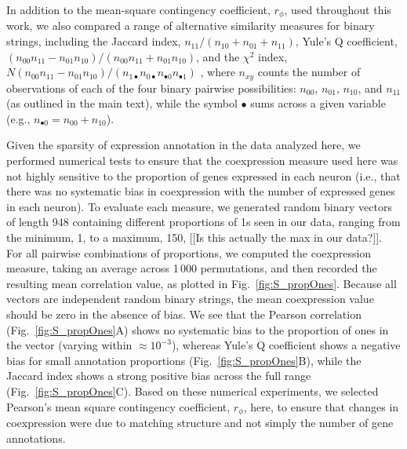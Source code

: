 \documentclass[10pt,letterpaper]{article}
\begin{document}
In addition to the mean-square contingency coefficient, $r_\phi$, used throughout this work, we also compared a range of alternative similarity measures for binary strings, including the
Jaccard index, $n_{11}/(n_{10}+n_{01}+n_{11})$,
Yule's Q coefficient, $(n_{00}n_{11} - n_{01}n_{10})/(n_{00}n_{11} + n_{01}n_{10})$,
and the $\chi^2$ index, $N (n_{00}n_{11} - n_{01}n_{10})/(n_{1\bullet}n_{0\bullet}n_{\bullet 0}n_{\bullet 1})$ \cite{Kaufman2006}, where $n_{xy}$ counts the number of observations of each of the four binary pairwise possibilities: $n_{00}$, $n_{01}$, $n_{10}$, and $n_{11}$ (as outlined in the main text), while the symbol $\bullet$ sums across a given variable (e.g., $n_{\bullet 0} = n_{00} + n_{10}$).

Given the sparsity of expression annotation in the data analyzed here, we performed numerical tests to ensure that the coexpression measure used here was not highly sensitive to the proportion of genes expressed in each neuron (i.e., that there was no systematic bias in coexpression with the number of expressed genes in each neuron).
To evaluate each measure, we generated random binary vectors of length 948 containing different proportions of 1s seen in our data, ranging from the minimum, 1, to a maximum, 150, [[Is this actually the max in our data?]].
For all pairwise combinations of proportions, we computed the coexpression measure, taking an average across 1\,000 permutations, and then recorded the resulting mean correlation value, as plotted in Fig.~\ref{fig:S_propOnes}.
Because all vectors are independent random binary strings, the mean coexpression value should be zero in the absence of bias.
We see that the Pearson correlation (Fig.~\ref{fig:S_propOnes}A) shows no systematic bias to the proportion of ones in the vector (varying within $\approx 10^{-3}$), whereas Yule's Q coefficient shows a negative bias for small annotation proportions (Fig.~\ref{fig:S_propOnes}B), while the Jaccard index shows a strong positive bias across the full range (Fig.~\ref{fig:S_propOnes}C).
Based on these numerical experiments, we selected Pearson's mean square contingency coefficient, $r_\phi$, here, to ensure that changes in coexpression were due to matching structure and not simply the number of gene annotations.
\end{document}

